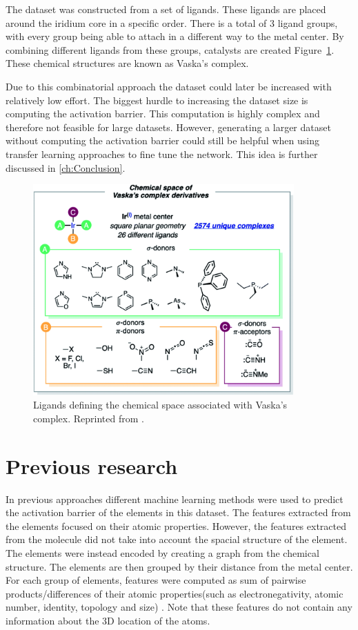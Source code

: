 The dataset was constructed from a set of ligands.
These ligands are placed around the iridium core in a specific order.
There is a total of 3 ligand groups, with every group being able to attach in a different way to the metal center.
By combining different ligands from these groups, catalysts are created Figure~\ref{fig:chemspace}.
These chemical structures are known as Vaska's complex.

Due to this combinatorial approach the dataset could later be increased with relatively low effort.
The biggest hurdle to increasing the dataset size is computing the activation barrier.
This computation is highly complex and therefore not feasible for large datasets.
However, generating a larger dataset without computing the activation barrier could still be helpful when using transfer learning approaches to fine tune the network.
This idea is further discussed in \ref{ch:Conclusion}.

\begin{figure}
  \centering
  \includegraphics[width=10cm]{figures/introduction/chem-space.png}
  \caption[Vaska's space]{Ligands defining the chemical space associated with Vaska's complex. Reprinted from \cite{friederich_dos}.}
  \label{fig:chemspace}
\end{figure}


\section{Previous research}

In previous approaches different machine learning methods were used to predict the activation barrier of the elements in this dataset.
The features extracted from the elements focused on their atomic properties.
However, the features extracted from the molecule did not take into account the spacial structure of the element.
The elements were instead encoded by creating a graph from the chemical structure.
The elements are then grouped by their distance from the metal center.
For each group of elements, features were computed as sum of pairwise products/differences of their atomic properties(such as electronegativity, atomic number, identity, topology and size) \cite{friederich_dos}.
Note that these features do not contain any information about the 3D location of the atoms.

